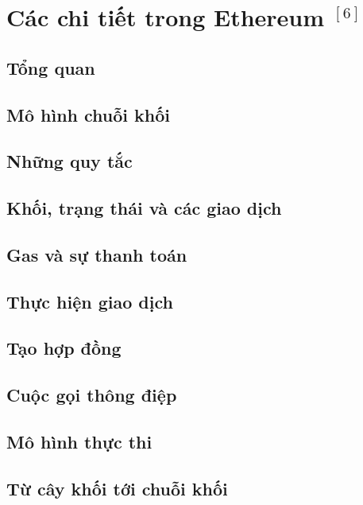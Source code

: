 \documentclass[12pt]{article}
\begin{document}
	\section{Các chi tiết trong Ethereum $^{[6]}$}
	\subsection{Tổng quan}
	

	\subsection{Mô hình chuỗi khối}
	

	\subsection{Những quy tắc}
	

	\subsection{Khối, trạng thái và các giao dịch}
	

	\subsection{Gas và sự thanh toán}
	
	
	\subsection{Thực hiện giao dịch}
	
	
	\subsection{Tạo hợp đồng}
		

	\subsection{Cuộc gọi thông điệp}
			
	
	\subsection{Mô hình thực thi}
			
	
	\subsection{Từ cây khối tới chuỗi khối}
	
	
\end{document}
